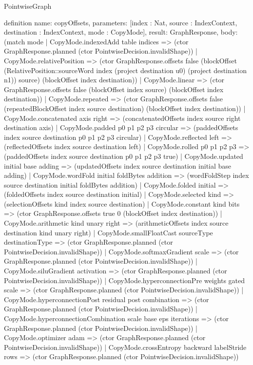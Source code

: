 \begin{lexlean}{PointwiseGraph}
\begin{semanticmodule}
definition{
  name: copyOffsets,
  parameters: [index : Nat, source : IndexContext, destination : IndexContext, mode : CopyMode],
  result: GraphResponse,
  body: (match mode
    | CopyMode.indexedAdd table indices => (ctor GraphResponse.planned (ctor PointwiseDecision.invalidShape))
    | CopyMode.relativePosition => (ctor GraphResponse.offsets false (blockOffset (RelativePosition::sourceWord index (project destination u0) (project destination n1)) source) (blockOffset index destination))
    | CopyMode.linear => (ctor GraphResponse.offsets false (blockOffset index source) (blockOffset index destination))
    | CopyMode.repeated => (ctor GraphResponse.offsets false (repeatedBlockOffset index source destination) (blockOffset index destination))
    | CopyMode.concatenated axis right => (concatenatedOffsets index source right destination axis)
    | CopyMode.padded p0 p1 p2 p3 circular => (paddedOffsets index source destination p0 p1 p2 p3 circular)
    | CopyMode.reflected left => (reflectedOffsets index source destination left)
    | CopyMode.rolled p0 p1 p2 p3 => (paddedOffsets index source destination p0 p1 p2 p3 true)
    | CopyMode.updated initial base adding => (updatedOffsets index source destination initial base adding)
    | CopyMode.wordFold initial foldBytes addition => (wordFoldStep index source destination initial foldBytes addition)
    | CopyMode.folded initial => (foldedOffsets index source destination initial)
    | CopyMode.selected kind => (selectionOffsets kind index source destination)
    | CopyMode.constant kind bits => (ctor GraphResponse.offsets true 0 (blockOffset index destination))
    | CopyMode.arithmetic kind unary right => (arithmeticOffsets index source destination kind unary right)
    | CopyMode.smallFloatCast sourceType destinationType => (ctor GraphResponse.planned (ctor PointwiseDecision.invalidShape))
    | CopyMode.softmaxGradient scale => (ctor GraphResponse.planned (ctor PointwiseDecision.invalidShape))
    | CopyMode.siluGradient activation => (ctor GraphResponse.planned (ctor PointwiseDecision.invalidShape))
    | CopyMode.hyperconnectionPre weights gated scale => (ctor GraphResponse.planned (ctor PointwiseDecision.invalidShape))
    | CopyMode.hyperconnectionPost residual post combination => (ctor GraphResponse.planned (ctor PointwiseDecision.invalidShape))
    | CopyMode.hyperconnectionCombination scale base eps iterations => (ctor GraphResponse.planned (ctor PointwiseDecision.invalidShape))
    | CopyMode.optimizer adam => (ctor GraphResponse.planned (ctor PointwiseDecision.invalidShape))
    | CopyMode.crossEntropy backward labelStride rows => (ctor GraphResponse.planned (ctor PointwiseDecision.invalidShape))
}
\end{semanticmodule}
\end{lexlean}

